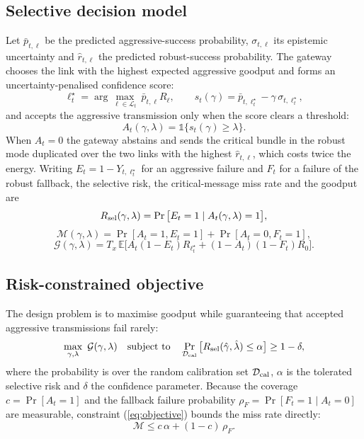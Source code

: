 \subsection{Selective decision model}
Let $\bar p_{t,\ell}$ be the predicted aggressive-success probability, $\sigma_{t,\ell}$ its epistemic uncertainty and $\hat r_{t,\ell}$ the predicted robust-success probability. The gateway chooses the link with the highest expected aggressive goodput and forms an uncertainty-penalised confidence score:
\begin{equation}\label{eq:choice}
\ell^\star_t=\arg\max_{\ell\in\mathcal L_t}\ \bar p_{t,\ell}R_\ell,\qquad
s_t(\gamma)=\bar p_{t,\ell^\star_t}-\gamma\,\sigma_{t,\ell^\star_t},
\end{equation}
and accepts the aggressive transmission only when the score clears a threshold:
\begin{equation}\label{eq:accept}
A_t(\gamma,\lambda)=\mathbb 1\{s_t(\gamma)\ge\lambda\}.
\end{equation}
When $A_t=0$ the gateway abstains and sends the critical bundle in the robust mode duplicated over the two links with the highest $\hat r_{t,\ell}$, which costs twice the energy. Writing $E_t=1-Y_{t,\ell^\star_t}$ for an aggressive failure and $F_t$ for a failure of the robust fallback, the selective risk, the critical-message miss rate and the goodput are
\begin{equation}\label{eq:selrisk}
R_{\rm sel}(\gamma,\lambda)=\Pr\big[E_t=1\mid A_t(\gamma,\lambda)=1\big],
\end{equation}
\begin{equation}\label{eq:miss}
\mathcal M(\gamma,\lambda)=\Pr[A_t=1,E_t=1]+\Pr[A_t=0,F_t=1],
\end{equation}
\begin{equation}\label{eq:goodput}
\mathcal G(\gamma,\lambda)=T_x\,\mathbb E\big[A_t(1-E_t)R_{\ell^\star_t}+(1-A_t)(1-F_t)R_0\big].
\end{equation}

\subsection{Risk-constrained objective}
The design problem is to maximise goodput while guaranteeing that accepted aggressive transmissions fail rarely:
\begin{equation}\label{eq:objective}
\max_{\gamma,\lambda}\ \mathcal G(\gamma,\lambda)\quad\text{subject to}\quad \Pr_{\mathcal D_{\rm cal}}\big[R_{\rm sel}(\hat\gamma,\hat\lambda)\le\alpha\big]\ge1-\delta,
\end{equation}
where the probability is over the random calibration set $\mathcal D_{\rm cal}$, $\alpha$ is the tolerated selective risk and $\delta$ the confidence parameter. Because the coverage $c=\Pr[A_t=1]$ and the fallback failure probability $\rho_F=\Pr[F_t=1\mid A_t=0]$ are measurable, constraint (\ref{eq:objective}) bounds the miss rate directly:
\begin{equation}\label{eq:missbound}
\mathcal M\le c\,\alpha+(1-c)\,\rho_F .
\end{equation}

